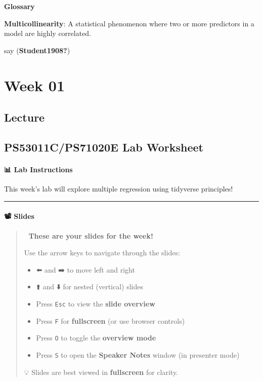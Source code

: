 \documentclass[
  letterpaper,
  DIV=11,
  numbers=noendperiod]{scrreprt}
\providecommand{\tightlist}{%
  \setlength{\itemsep}{0pt}\setlength{\parskip}{0pt}}\usepackage{longtable,booktabs,array}
\begin{document}
\begin{gsglossary}

\textbf{Glossary}

\textbf{Multicollinearity}: A statistical phenomenon where two or more
predictors in a model are highly correlated.

\end{gsglossary}

say (\textbf{Student1908?})

\part{Week 01}

\chapter{Lecture}\label{lecture}

\chapter{PS53011C/PS71020E Lab
Worksheet}\label{ps53011cps71020e-lab-worksheet}

\subsection{📊 Lab Instructions}

This week's lab will explore multiple regression using tidyverse
principles!

\begin{center}\rule{0.5\linewidth}{0.5pt}\end{center}

\subsection{📽️ Slides}

\begin{quote}
🧭 \textbf{These are your slides for the week!}

Use the arrow keys to navigate through the slides:

\begin{itemize}
\tightlist
\item
  ⬅️ and ➡️ to move left and right
\item
  ⬆️ and ⬇️ for nested (vertical) slides
\item
  Press \texttt{Esc} to view the \textbf{slide overview}
\item
  Press \texttt{F} for \textbf{fullscreen} (or use browser controls)
\item
  Press \texttt{O} to toggle the \textbf{overview mode}
\item
  Press \texttt{S} to open the \textbf{Speaker Notes} window (in
  presenter mode)
\end{itemize}

💡 Slides are best viewed in \textbf{fullscreen} for clarity.
\end{quote}
\end{document}
